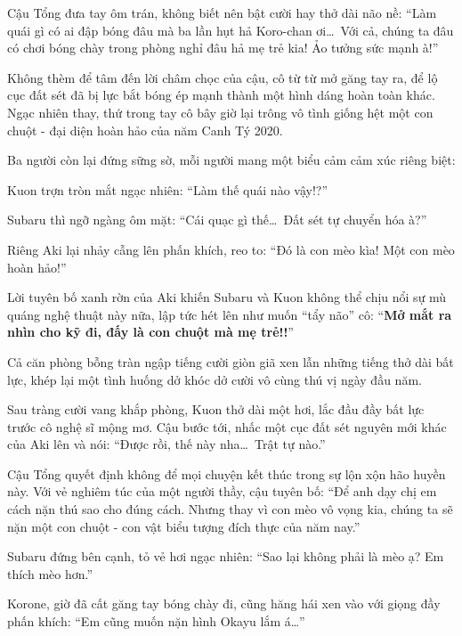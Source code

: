 \documentclass[../main.tex]{subfiles}
\begin{document}
Cậu Tổng đưa tay ôm trán, không biết nên bật cười hay thở dài não nề: ``Làm quái gì có ai đập bóng đâu mà ba lần hụt hả Koro-chan ơi\dots\ Với cả, chúng ta đâu có chơi bóng chày trong phòng nghỉ đâu hả mẹ trẻ kia! Ảo tưởng sức mạnh à!''

Không thèm để tâm đến lời châm chọc của cậu, cô từ từ mở găng tay ra, để lộ cục đất sét đã bị lực bắt bóng ép mạnh thành một hình dáng hoàn toàn khác. Ngạc nhiên thay, thứ trong tay cô bây giờ lại trông vô tình giống hệt một con chuột - đại diện hoàn hảo của năm Canh Tý 2020.


Ba người còn lại đứng sững sờ, mỗi người mang một biểu cảm cảm xúc riêng biệt:

Kuon trợn tròn mắt ngạc nhiên: ``Làm thế quái nào vậy!?''

Subaru thì ngỡ ngàng ôm mặt: ``Cái quạc gì thế\dots\ Đất sét tự chuyển hóa à?''

Riêng Aki lại nhảy cẫng lên phấn khích, reo to: ``Đó là con mèo kìa! Một con mèo hoàn hảo!''

Lời tuyên bố xanh rờn của Aki khiến Subaru và Kuon không thể chịu nổi sự mù quáng nghệ thuật này nữa, lập tức hét lên như muốn ``tẩy não'' cô: ``\textbf{Mở mắt ra nhìn cho kỹ đi, đấy là con chuột mà mẹ trẻ!!}''

Cả căn phòng bỗng tràn ngập tiếng cười giòn giã xen lẫn những tiếng thở dài bất lực, khép lại một tình huống dở khóc dở cười vô cùng thú vị ngày đầu năm.

\omk

Sau tràng cười vang khắp phòng, Kuon thở dài một hơi, lắc đầu đầy bất lực trước cô nghệ sĩ mộng mơ. Cậu bước tới, nhấc một cục đất sét nguyên mới khác của Aki lên và nói: ``Được rồi, thế này nha\dots\ Trật tự nào.''

Cậu Tổng quyết định không để mọi chuyện kết thúc trong sự lộn xộn hão huyền này. Với vẻ nghiêm túc của một người thầy, cậu tuyên bố: ``Để anh dạy chị em cách nặn thú sao cho đúng cách. Nhưng thay vì con mèo vô vọng kia, chúng ta sẽ nặn một con chuột - con vật biểu tượng đích thực của năm nay.''

Subaru đứng bên cạnh, tỏ vẻ hơi ngạc nhiên: ``Sao lại không phải là mèo ạ? Em thích mèo hơn.''

Korone, giờ đã cất găng tay bóng chày đi, cũng hăng hái xen vào với giọng đầy phấn khích: ``Em cũng muốn nặn hình Okayu lắm á\dots''
\end{document}
